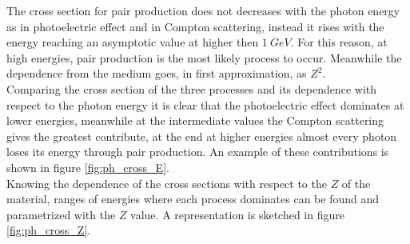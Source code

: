 The cross section for pair production does not decreases with the photon energy as in photoelectric effect and in Compton scattering, instead it rises with the energy reaching an asymptotic value at higher then $1\ GeV$. For this reason, at high energies, pair production is the most likely process to occur.
Meanwhile the dependence from the medium goes, in first approximation, as $Z^2$.\\

Comparing the cross section of the three processes and its dependence with respect to the photon energy it is clear that the photoelectric effect dominates at lower energies, meanwhile at the intermediate values the Compton scattering gives the greatest contribute, at the end at higher energies almost every photon loses its energy through pair production. An example of these contributions is shown in figure \ref{fig:ph_cross_E}.\\
Knowing the dependence of the cross sections with respect to the $Z$ of the material, ranges of energies where each process dominates can be found and parametrized with the $Z$ value. A representation is sketched in figure \ref{fig:ph_cross_Z}.\\ 


